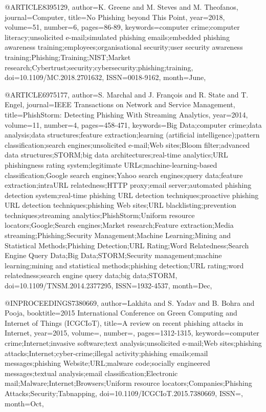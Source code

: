 @ARTICLE{8395129,
author={K. Greene and M. Steves and M. Theofanos},
journal={Computer},
title={No Phishing beyond This Point},
year={2018},
volume={51},
number={6},
pages={86-89},
keywords={computer crime;computer literacy;unsolicited e-mail;simulated phishing emails;embedded phishing awareness training;employees;organisational security;user security awareness training;Phishing;Training;NIST;Market research;Cybertrust;security;cybersecurity;phishing;training},
doi={10.1109/MC.2018.2701632},
ISSN={0018-9162},
month={June},}

@ARTICLE{6975177,
author={S. Marchal and J. François and R. State and T. Engel},
journal={IEEE Transactions on Network and Service Management},
title={PhishStorm: Detecting Phishing With Streaming Analytics},
year={2014},
volume={11},
number={4},
pages={458-471},
keywords={Big Data;computer crime;data analysis;data structures;feature extraction;learning (artificial intelligence);pattern classification;search engines;unsolicited e-mail;Web sites;Bloom filter;advanced data structures;STORM;big data architectures;real-time analytics;URL phishingness rating system;legitimate URLs;machine-learning-based classification;Google search engines;Yahoo search engines;query data;feature extraction;intraURL relatedness;HTTP proxy;email server;automated phishing detection system;real-time phishing URL detection techniques;proactive phishing URL detection techniques;phishing Web sites;URL blacklisting;prevention techniques;streaming analytics;PhishStorm;Uniform resource locators;Google;Search engines;Market research;Feature extraction;Media streaming;Phishing;Security Management;Machine Learning;Mining and Statistical Methods;Phishing Detection;URL Rating;Word Relatedness;Search Engine Query Data;Big Data;STORM;Security management;machine learning;mining and statistical methods;phishing detection;URL rating;word relatedness;search engine query data;big data;STORM},
doi={10.1109/TNSM.2014.2377295},
ISSN={1932-4537},
month={Dec},}

@INPROCEEDINGS{7380669,
author={Lakhita and S. Yadav and B. Bohra and Pooja},
booktitle={2015 International Conference on Green Computing and Internet of Things (ICGCIoT)},
title={A review on recent phishing attacks in Internet},
year={2015},
volume={},
number={},
pages={1312-1315},
keywords={computer crime;Internet;invasive software;text analysis;unsolicited e-mail;Web sites;phishing attacks;Internet;cyber-crime;illegal activity;phishing emails;email messages;phishing Website;URL;malware code;socially engineered messages;textual analysis;email classification;Electronic mail;Malware;Internet;Browsers;Uniform resource locators;Companies;Phishing Attacks;Security;Tabnapping},
doi={10.1109/ICGCIoT.2015.7380669},
ISSN={},
month={Oct},}
